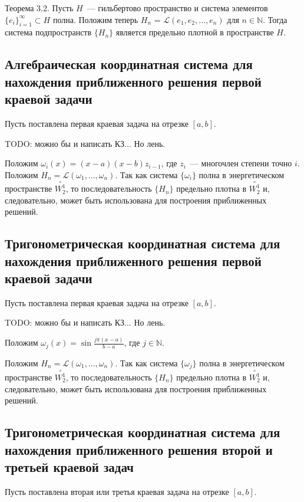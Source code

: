 \documentclass[a4paper,14pt]{article} %
\begin{document}
Теорема 3.2.
Пусть $H$~--- гильбертово пространство и
система элементов $\{e_i \}_{i=1}^\infty \subset H$ полна.
Положим теперь $H_n$ = $\mathcal{L} (e_1 , e_2 , ... , e_n )$ для $n \in \mathbb{N}$.
Тогда система подпространств $\{H_n \}$
является предельно плотной в пространстве $H$.


\subsection{Алгебраическая координатная система для нахождения приближенного решения первой краевой задачи}

Пусть поставлена первая краевая задача на отрезке $[a,b]$.

TODO: можно бы и написать КЗ... Но лень.

Положим $\omega_i(x) = (x-a)(x-b)z_{i-1}$,
где $z_i$~--- многочлен степени точно $i$.
Положим $H_n = \mathcal{L}(\omega_1, ..., \omega_n)$.
Так как система $\{\omega_i\}$ полна в энергетическом пространстве $\overset{\circ}{W^1_2}$,
то последовательность $\{H_n\}$ предельно плотна в $\overset{\circ}{W^1_2}$ и, следовательно,
может быть использована для построения приближенных решений.

\subsection{Тригонометрическая координатная система для нахождения приближенного решения первой краевой задачи}

Пусть поставлена первая краевая задача на отрезке $[a,b]$.

TODO: можно бы и написать КЗ... Но лень.

Положим $\omega_j(x) = \sin\frac{j\pi(x-a)}{b-a}$,
где $j\in\mathbb{N}$.

Положим $H_n = \mathcal{L}(\omega_1, ..., \omega_n)$.
Так как система $\{\omega_j\}$ полна в энергетическом пространстве $\overset{\circ}{W^1_2}$,
то последовательность $\{H_n\}$ предельно плотна в $\overset{\circ}{W^1_2}$ и, следовательно,
может быть использована для построения приближенных решений.


\subsection{Тригонометрическая координатная система для нахождения приближенного решения второй и третьей краевой задач}

Пусть поставлена вторая или третья краевая задача на отрезке $[a,b]$.
\end{document}
